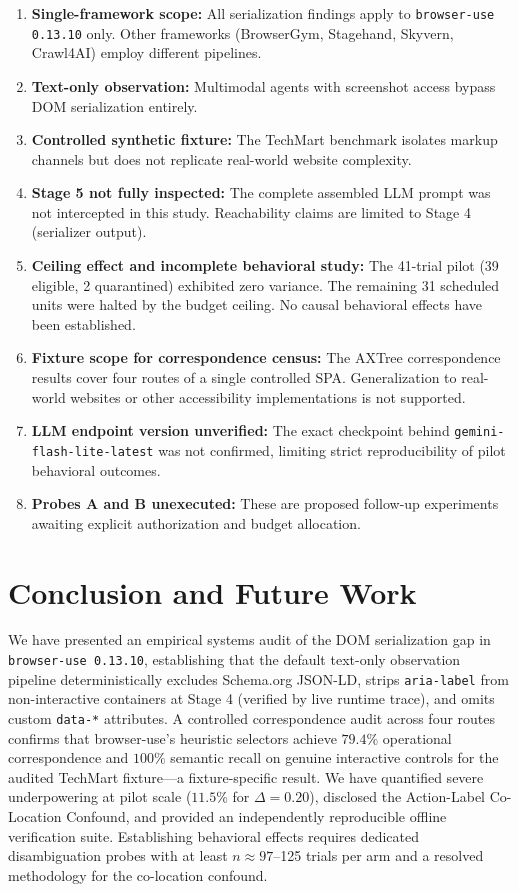 \documentclass[conference]{IEEEtran}
\begin{document}
\begin{enumerate}
    \item \textbf{Single-framework scope:} All serialization findings apply to \texttt{browser-use 0.13.10} only. Other frameworks (BrowserGym, Stagehand, Skyvern, Crawl4AI) employ different pipelines.
    \item \textbf{Text-only observation:} Multimodal agents with screenshot access bypass DOM serialization entirely.
    \item \textbf{Controlled synthetic fixture:} The TechMart benchmark isolates markup channels but does not replicate real-world website complexity.
    \item \textbf{Stage 5 not fully inspected:} The complete assembled LLM prompt was not intercepted in this study. Reachability claims are limited to Stage 4 (serializer output).
    \item \textbf{Ceiling effect and incomplete behavioral study:} The 41-trial pilot (39 eligible, 2 quarantined) exhibited zero variance. The remaining 31 scheduled units were halted by the budget ceiling. No causal behavioral effects have been established.
    \item \textbf{Fixture scope for correspondence census:} The AXTree correspondence results cover four routes of a single controlled SPA. Generalization to real-world websites or other accessibility implementations is not supported.
    \item \textbf{LLM endpoint version unverified:} The exact checkpoint behind \texttt{gemini-flash-lite-latest} was not confirmed, limiting strict reproducibility of pilot behavioral outcomes.
    \item \textbf{Probes A and B unexecuted:} These are proposed follow-up experiments awaiting explicit authorization and budget allocation.
\end{enumerate}

\section{Conclusion and Future Work}
\label{sec:conclusion}

We have presented an empirical systems audit of the DOM serialization gap in \texttt{browser-use 0.13.10}, establishing that the default text-only observation pipeline deterministically excludes Schema.org JSON-LD, strips \texttt{aria-label} from non-interactive containers at Stage 4 (verified by live runtime trace), and omits custom \texttt{data-*} attributes. A controlled correspondence audit across four routes confirms that browser-use's heuristic selectors achieve $79.4\%$ operational correspondence and $100\%$ semantic recall on genuine interactive controls for the audited TechMart fixture---a fixture-specific result. We have quantified severe underpowering at pilot scale ($11.5\%$ for $\Delta=0.20$), disclosed the Action-Label Co-Location Confound, and provided an independently reproducible offline verification suite. Establishing behavioral effects requires dedicated disambiguation probes with at least $n \approx 97$--125 trials per arm and a resolved methodology for the co-location confound.
\end{document}
